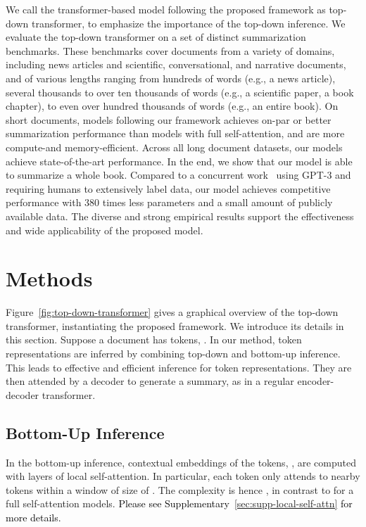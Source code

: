 \documentclass{article} \usepackage{iclr2022_conference,times}
\begin{document}
We call the transformer-based model following the proposed framework as top-down transformer, to emphasize the importance of the top-down inference.  We evaluate the top-down transformer on a set of distinct summarization benchmarks. These benchmarks cover documents from a variety of domains, including news articles and scientific, conversational, and narrative documents, and of various lengths ranging from hundreds of words (e.g., a news article), several thousands to over ten thousands of words (e.g., a scientific paper, a book chapter), to even over hundred thousands of words (e.g., an entire book). On short documents, models following our framework achieves on-par or better summarization performance than models with full self-attention, and are more compute-and memory-efficient. Across all long document datasets, our models achieve state-of-the-art performance. In the end, we show that our model is able to summarize a whole book. Compared to a concurrent work~\citep{wu2021recursively} using GPT-3 and requiring humans to extensively label data, our model achieves competitive performance with 380 times less parameters and a small amount of publicly available data. The diverse and strong empirical results support the effectiveness and wide applicability of the proposed model.





















\section{Methods}
Figure~\ref{fig:top-down-transformer} gives a graphical overview of the top-down transformer, instantiating the proposed framework. We introduce its details in this section. Suppose a document has  tokens, . In our method, token representations are inferred by combining top-down and bottom-up inference. This leads to effective and efficient inference for token representations. They are then attended by a decoder to generate a summary, as in a regular encoder-decoder transformer.



\subsection{Bottom-Up Inference}
In the bottom-up inference, contextual embeddings of the tokens, , are computed with  layers of local self-attention. In particular, each token  only attends to nearby tokens within a window of size of . The complexity is hence , in contrast to  for a full self-attention models. \textcolor{black}{Please see Supplementary~\ref{sec:supp-local-self-attn} for more details.} 
\end{document}
